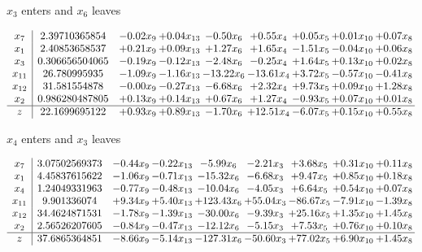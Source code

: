 \documentclass[8pt]{article}
\begin{document}
 $ x_{3} $ enters and $ x_{6} $ leaves 

 \[\begin{array}{c| c c@{\hskip 2pt} c@{\hskip 2pt} c@{\hskip 2pt} c@{\hskip 2pt} c@{\hskip 2pt} c@{\hskip 2pt} c@{\hskip 2pt} }
 x_{7}   &  2.39710365854 & -0.02 x_{9} & +  0.04 x_{13} & -0.50 x_{6} & +  0.55 x_{4} & +  0.05 x_{5} & +  0.01 x_{10} & +  0.07 x_{8}\\
 x_{1}   &  2.40853658537 & +  0.21 x_{9} & +  0.09 x_{13} & +  1.27 x_{6} & +  1.65 x_{4} & -1.51 x_{5} & -0.04 x_{10} & +  0.06 x_{8}\\
 x_{3}   &  0.306656504065 & -0.19 x_{9} & -0.12 x_{13} & -2.48 x_{6} & -0.25 x_{4} & +  1.64 x_{5} & +  0.13 x_{10} & +  0.02 x_{8}\\
 x_{11}   &  26.780995935 & -1.09 x_{9} & -1.16 x_{13} & -13.22 x_{6} & -13.61 x_{4} & +  3.72 x_{5} & -0.57 x_{10} & -0.41 x_{8}\\
 x_{12}   &  31.581554878 & -0.00 x_{9} & -0.27 x_{13} & -6.68 x_{6} & +  2.32 x_{4} & +  9.73 x_{5} & +  0.09 x_{10} & +  1.28 x_{8}\\
 x_{2}   &  0.986280487805 & +  0.13 x_{9} & +  0.14 x_{13} & +  0.67 x_{6} & +  1.27 x_{4} & -0.93 x_{5} & +  0.07 x_{10} & +  0.01 x_{8}\\
\hline
z    &  22.1699695122 & +  0.93 x_{9} & +  0.89 x_{13} & -1.70 x_{6} & + 12.51 x_{4} & -6.07 x_{5} & +  0.15 x_{10} & +  0.55 x_{8}\\
\end{array}\]


 $ x_{4} $ enters and $ x_{3} $ leaves 

 \[\begin{array}{c| c c@{\hskip 2pt} c@{\hskip 2pt} c@{\hskip 2pt} c@{\hskip 2pt} c@{\hskip 2pt} c@{\hskip 2pt} c@{\hskip 2pt} }
 x_{7}   &  3.07502569373 & -0.44 x_{9} & -0.22 x_{13} & -5.99 x_{6} & -2.21 x_{3} & +  3.68 x_{5} & +  0.31 x_{10} & +  0.11 x_{8}\\
 x_{1}   &  4.45837615622 & -1.06 x_{9} & -0.71 x_{13} & -15.32 x_{6} & -6.68 x_{3} & +  9.47 x_{5} & +  0.85 x_{10} & +  0.18 x_{8}\\
 x_{4}   &  1.24049331963 & -0.77 x_{9} & -0.48 x_{13} & -10.04 x_{6} & -4.05 x_{3} & +  6.64 x_{5} & +  0.54 x_{10} & +  0.07 x_{8}\\
 x_{11}   &  9.901336074 & +  9.34 x_{9} & +  5.40 x_{13} & + 123.43 x_{6} & + 55.04 x_{3} & -86.67 x_{5} & -7.91 x_{10} & -1.39 x_{8}\\
 x_{12}   &  34.4624871531 & -1.78 x_{9} & -1.39 x_{13} & -30.00 x_{6} & -9.39 x_{3} & + 25.16 x_{5} & +  1.35 x_{10} & +  1.45 x_{8}\\
 x_{2}   &  2.56526207605 & -0.84 x_{9} & -0.47 x_{13} & -12.12 x_{6} & -5.15 x_{3} & +  7.53 x_{5} & +  0.76 x_{10} & +  0.10 x_{8}\\
\hline
z    &  37.6865364851 & -8.66 x_{9} & -5.14 x_{13} & -127.31 x_{6} & -50.60 x_{3} & + 77.02 x_{5} & +  6.90 x_{10} & +  1.45 x_{8}\\
\end{array}\]
\end{document}
